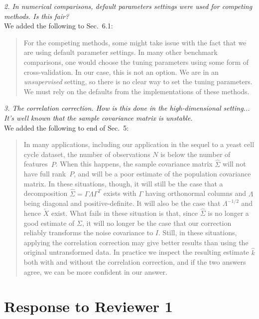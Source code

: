 \documentclass[11pt]{article}
\newcommand{\T}{T}
\begin{document}
\noindent
\emph{2. In numerical comparisons, default parameters settings were used for
competing methods. Is this fair?}
\\

We added the following to Sec.~6.1:

\begin{quote}
For the competing methods, some might take issue with the fact that we are
using default parameter settings.  In many other benchmark comparisons, one
would choose the tuning parameters using some form of cross-validation. In our
case, this is not an option. We are in an \emph{unsupervised} setting, so
there is no clear way to set the tuning parameters. We must rely on the
defaults from the implementations of these methods.
\end{quote}


\noindent
\emph{3. The correlation correction. How is this done in the high-dimensional
setting... It's well known that the sample covariance matrix is unstable.}
\\

We added the following to end of Sec.~5:


\begin{quote}
In many applications, including our application in the sequel to a yeast cell
cycle dataset, the number of observations $N$ is below the number of
features~$P$. When this happens, the sample covariance matrix $\hat \Sigma$
will not have full rank~$P$, and will be a poor estimate of the population
covariance matrix. In these situations, though, it will still be the case that
a decomposition $\hat \Sigma = \Gamma \Lambda \Gamma^\T$ exists with $\Gamma$
having orthonormal columns and $\Lambda$ being diagonal and positive-definite.
It will also be the case that $\Lambda^{-1/2}$ and hence $\tilde{X}$
exist. What fails in these situation is that, since $\hat \Sigma$ is no longer
a good estimate of $\Sigma$, it will no longer be the case that our correction
reliably transforms the noise covariance to $I$. Still, in these situations,
applying the correlation correction may give better results than using the
original untransformed data. In practice we inspect the resulting estimate
$\hat k$ both with and without the correlation correction, and if the two
answers agree, we can be more confident in our answer.
\end{quote}


\newpage


\section{Response to Reviewer 1}
\end{document}

